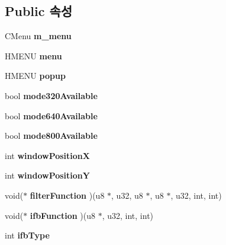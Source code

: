 \subsection*{Public 속성}
\begin{DoxyCompactItemize}
\item 
\mbox{\label{class_v_b_a_a7f2defb31b3597bac8b7e372b2b12fba}} 
C\+Menu {\bfseries m\+\_\+menu}
\item 
\mbox{\label{class_v_b_a_acf9d855b5b959a2df9c6cb21b888366e}} 
H\+M\+E\+NU {\bfseries menu}
\item 
\mbox{\label{class_v_b_a_ae9de0b5d432ad2e8a21faf040182fe03}} 
H\+M\+E\+NU {\bfseries popup}
\item 
\mbox{\label{class_v_b_a_adcefc742bdb15ddb902bcb2df896d298}} 
bool {\bfseries mode320\+Available}
\item 
\mbox{\label{class_v_b_a_adc44d61208b927bde7ea49c25a2e30bc}} 
bool {\bfseries mode640\+Available}
\item 
\mbox{\label{class_v_b_a_a3e2e940c6531daba73473c51a9916574}} 
bool {\bfseries mode800\+Available}
\item 
\mbox{\label{class_v_b_a_a5f9fb2744603deedbe9f8a77a7a2cf91}} 
int {\bfseries window\+PositionX}
\item 
\mbox{\label{class_v_b_a_a79b40ebb7ccfd4390eb0747168d07cad}} 
int {\bfseries window\+PositionY}
\item 
\mbox{\label{class_v_b_a_a8267ca41247e8d752776b57a3f8af011}} 
void($\ast$ {\bfseries filter\+Function} )(u8 $\ast$, u32, u8 $\ast$, u8 $\ast$, u32, int, int)
\item 
\mbox{\label{class_v_b_a_af044c0f19b7118a5cc01cf25e059145e}} 
void($\ast$ {\bfseries ifb\+Function} )(u8 $\ast$, u32, int, int)
\item 
\mbox{\label{class_v_b_a_a4349741c5cec8852f8914093484418e8}} 
int {\bfseries ifb\+Type}
\item 

\end{DoxyCompactItemize}
